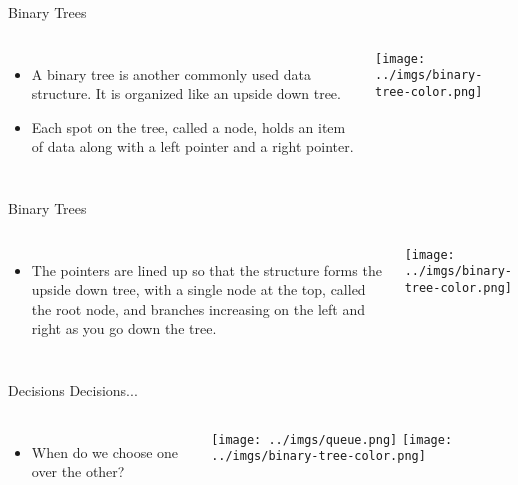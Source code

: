 \documentclass{beamer}
\begin{document}
\begin{frame}{Binary Trees}
\begin{columns}[c]
\begin{itemize}
\item A binary tree is another commonly used data structure. It is organized like an upside down tree. 
\item Each spot on the tree, called a node, holds an item of data along with a left pointer and a right pointer. 
\end{itemize}
\texttt{[image: ../imgs/binary-tree-color.png]}
\end{columns}
\end{frame}

\begin{frame}{Binary Trees}
\begin{columns}[c]
\begin{itemize}
\item The pointers are lined up so that the structure forms the upside down tree, with a single node at the top, called the root node, and branches increasing on the left and right as you go down the tree.
\end{itemize}
\texttt{[image: ../imgs/binary-tree-color.png]}
\end{columns}
\end{frame}

\begin{frame}{Decisions Decisions...}
\begin{columns}[c]
\begin{itemize}
\item When do we choose one over the other?
\end{itemize}
\texttt{[image: ../imgs/queue.png]}
\texttt{[image: ../imgs/binary-tree-color.png]}
\end{columns}
\end{frame}
\end{document}
